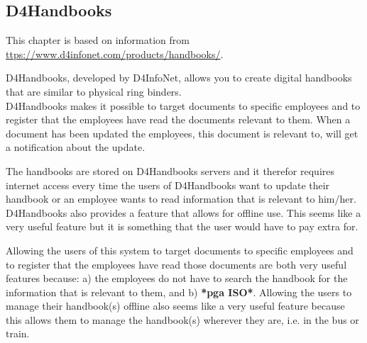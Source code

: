 \subsection{D4Handbooks}
This chapter is based on information from \url{ttps://www.d4infonet.com/products/handbooks/}.

D4Handbooks, developed by D4InfoNet, allows you to create digital handbooks that are similar to physical ring binders.\\
D4Handbooks makes it possible to target documents to specific employees and to register that the employees have read the documents relevant to them. When a document has been updated the employees, this document is relevant to, will get a notification about the update.

The handbooks are stored on D4Handbooks servers and it therefor requires internet access every time the users of D4Handbooks want to update their handbook or an employee wants to read information that is relevant to him/her.\\
D4Handbooks also provides a feature that allows for offline use. This seems like a very useful feature but it is something that the user would have to pay extra for.

Allowing the users of this system to target documents to specific employees and to register that the employees have read those documents are both very useful features because: a) the employees do not have to search the handbook for the information that is relevant to them, and b) \textbf{*pga ISO*}. Allowing the users to manage their handbook(s) offline also seems like a very useful feature because this allows them to manage the handbook(s) wherever they are, i.e. in the bus or train. 
